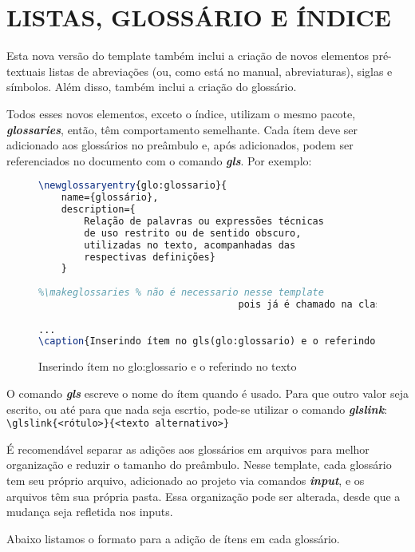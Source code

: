 \chapter{LISTAS, GLOSSÁRIO E ÍNDICE}\label{cap:listasEGlossario}

Esta nova versão do template também inclui a criação de novos elementos pré-textuais listas de abreviações (ou, como está no manual, abreviaturas), siglas e símbolos. Além disso, também inclui a criação do glossário.

Todos esses novos elementos, exceto o índice, utilizam o mesmo pacote, \textit{\textbf{glossaries}}, então, têm comportamento semelhante. Cada ítem deve ser adicionado aos glossários no preâmbulo e, após adicionados, podem ser referenciados no documento com o comando \textit{\textbf{gls}}. Por exemplo:
	
\begin{figure}[!htb]
	\centering
	\caption{Inserindo ítem no \gls{glo:glossario} e o referindo no texto} %
	\begin{lstlisting}[language=tex]
\newglossaryentry{glo:glossario}{
	name={glossário}, 
	description={
		Relação de palavras ou expressões técnicas 
		de uso restrito ou de sentido obscuro, 
		utilizadas no texto, acompanhadas das 
		respectivas definições}
	}
		
%\makeglossaries % não é necessario nesse template
		                           pois já é chamado na classe

...
\caption{Inserindo ítem no gls(glo:glossario) e o referindo no texto}
	\end{lstlisting}
	\label{fig:exemploglossario1} %
\end{figure}

O comando \textit{\textbf{gls}} escreve o nome do ítem quando é usado. Para que outro valor seja escrito, ou até para que nada seja escrtio, pode-se utilizar o comando \textit{\textbf{glslink}}:\\
\verb|\glslink{<rótulo>}{<texto alternativo>}|

É recomendável separar as adições aos glossários em arquivos para melhor organização e reduzir o tamanho do preâmbulo. Nesse template, cada glossário tem seu próprio arquivo, adicionado ao projeto via comandos \textit{\textbf{input}}, e os arquivos têm sua própria pasta. Essa organização pode ser alterada, desde que a mudança seja refletida nos inputs.

\newpage
Abaixo listamos o formato para a adição de ítens em cada glossário. 

